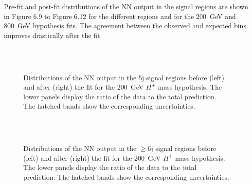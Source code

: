 Pre-fit and post-fit distributions of the NN output in the signal regions are shown in Figure 6.9 to Figure 6.12 for the different regions and for the 200~GeV and 800~GeV hypothesis fits. The agreement between the observed and expected bins improves drastically after the fit

\begin{figure}[htb]
    \RawFloats
    \centering
    \\
    \\
    \caption{Distributions of the NN output in the 5j signal regions before (left) and after (right) the fit for the 200~GeV $H^+$ mass hypothesis. The lower panels display the ratio of the data to the total prediction. The hatched bands show the corresponding uncertainties.
    }
    \label{Hplustb:prepost2005j}
\end{figure}

\begin{figure}[htb]
    \RawFloats
    \centering
    \\
    \\
    \caption{Distributions of the NN output in the $\geq$6j signal regions before (left) and after (right) the fit for the 200~GeV $H^+$ mass hypothesis. The lower panels display the ratio of the data to the total prediction. The hatched bands show the corresponding uncertainties.
    }
    \label{Hplustb:prepost2006j}
\end{figure}

